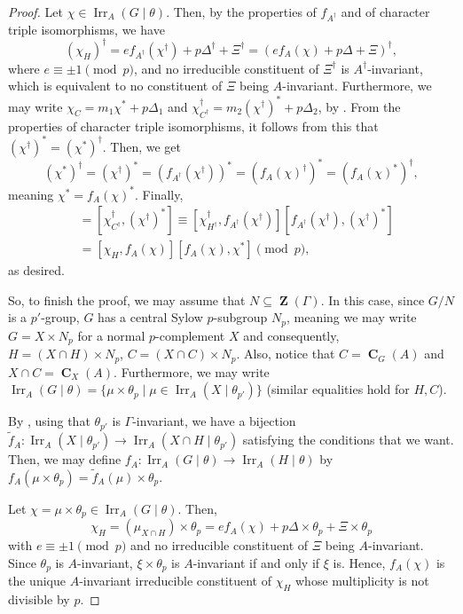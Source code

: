 \documentclass[12pt]{amsart}
\DeclareMathOperator{\ZB}{\mathbf{Z}}
\DeclareMathOperator{\CB}{\mathbf{C}}
\DeclareMathOperator{\Irr}{Irr}
\theoremstyle{remark}
\theoremstyle{definition}
\theoremstyle{plain}
\theoremstyle{definition}
\numberwithin{equation}{section}
\begin{document}
\begin{proof}
	Let $\chi \in \Irr_A(G \mid \theta)$. Then, by the properties of $f_{A^\dagger}$ and of character triple isomorphisms, we have
	\begin{equation*}
		(\chi_H)^\dagger = ef_{A^\dagger}(\chi^\dagger) + p\Delta^\dagger + \Xi^\dagger =  (ef_{A}(\chi) + p\Delta+ \Xi)^\dagger,
	\end{equation*}
	where $e \equiv \pm 1 \pmod{p}$, and no irreducible constituent of $\Xi^\dagger$ is $A^\dagger$-invariant, which is equivalent to no constituent of $\Xi$ being $A$-invariant. Furthermore, we may write $\chi_C = m_1 \chi^* + p\Delta_1$ and $\chi^\dagger_{C^\dagger} = m_2 (\chi^\dagger)^* + p\Delta_2$, by . From the properties of character triple isomorphisms, it follows from this that $(\chi^\dagger)^* = (\chi^*)^\dagger$. Then, we get
	\begin{equation*}
		(\chi^*)^\dagger = (\chi^\dagger)^* = (f_{A^\dagger}(\chi^\dagger))^* = (f_A(\chi)^\dagger)^* = (f_A(\chi)^*)^\dagger,
	\end{equation*}
	meaning $\chi^* = f_A(\chi)^*$. Finally, 
	\begin{align*}
		[\chi_C, \chi^*] &= [\chi^\dagger_{C^\dagger}, (\chi^\dagger)^*] \equiv [\chi^\dagger_{H^\dagger}, f_{A^\dagger}(\chi^\dagger)][f_{A^\dagger}(\chi^\dagger), (\chi^\dagger)^*] \\
		&= [\chi_H, f_A(\chi)][f_A(\chi), \chi^*] \pmod{p},
	\end{align*}
	as desired.
	
	So, to finish the proof, we may assume that $N \subseteq \ZB(\Gamma)$. In this case, since $G/N$ is a $p'$-group, $G$ has a central Sylow $p$-subgroup $N_p$, meaning we may write $G = X \times N_p$ for a normal $p$-complement $X$ and consequently, $H = (X \cap H) \times N_p$, $C = (X \cap C) \times N_p$. Also, notice that $C = \CB_G(A)$ and $X \cap C = \CB_X(A)$. Furthermore, we may write $\Irr_A(G \mid \theta) = \{\mu \times \theta_p \mid \mu \in \Irr_A(X \mid \theta_{p'})\}$ (similar equalities hold for $H, C$). 
	
	By , using that $\theta_{p'}$ is $\Gamma$-invariant, we have a bijection $\tilde{f}_A: \Irr_A(X \mid \theta_{p'}) \to \Irr_A(X \cap H \mid \theta_{p'})$ satisfying the conditions that we want. Then, we may define $f_A: \Irr_A(G \mid \theta) \to \Irr_A(H \mid \theta)$ by $f_A(\mu \times \theta_p) = \tilde{f}_A(\mu) \times \theta_p$.
	
	Let $\chi = \mu \times \theta_p \in \Irr_A(G \mid \theta)$. Then,
	\begin{equation*}
		\chi_H = (\mu_{X \cap H}) \times \theta_p = e f_A(\chi) + p\Delta \times \theta_p + \Xi \times \theta_p
	\end{equation*}
	with $e \equiv \pm 1 \pmod{p}$ and no irreducible constituent of $\Xi$ being $A$-invariant. Since $\theta_p$ is $A$-invariant, $\xi \times \theta_p$ is $A$-invariant if and only if $\xi$ is. Hence, $f_A(\chi)$ is the unique $A$-invariant irreducible constituent of $\chi_H$ whose multiplicity is not divisible by $p$. 
	

\end{proof}
\end{document}

